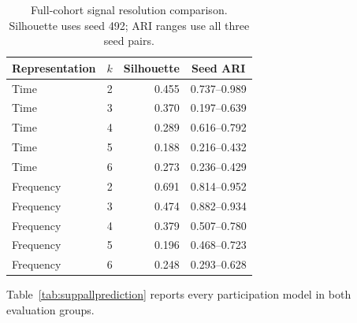\documentclass[journal,letterpaper]{IEEEtran}
\begin{document}
\begin{table}[t]
\centering\footnotesize
\caption{Full-cohort signal resolution comparison. Silhouette uses seed 492; ARI ranges use all three seed pairs.}
\label{tab:suppsignalresolution}
\begin{tabular}{lrrc}
\toprule
Representation & $k$ & Silhouette & Seed ARI \\
\midrule
Time & 2 & 0.455 & 0.737--0.989 \\
Time & 3 & 0.370 & 0.197--0.639 \\
Time & 4 & 0.289 & 0.616--0.792 \\
Time & 5 & 0.188 & 0.216--0.432 \\
Time & 6 & 0.273 & 0.236--0.429 \\
Frequency & 2 & 0.691 & 0.814--0.952 \\
Frequency & 3 & 0.474 & 0.882--0.934 \\
Frequency & 4 & 0.379 & 0.507--0.780 \\
Frequency & 5 & 0.196 & 0.468--0.723 \\
Frequency & 6 & 0.248 & 0.293--0.628 \\
\bottomrule
\end{tabular}
\end{table}
Table~\ref{tab:suppallprediction} reports every participation model in both evaluation groups.
\end{document}

